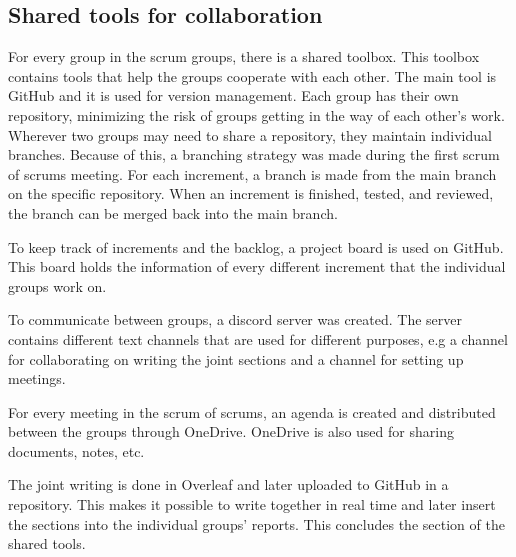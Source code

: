 \subsection{Shared tools for collaboration}\label{sub:shared-tools-for-collaboration}
For every group in the scrum groups, there is a shared toolbox.
This toolbox contains tools that help the groups cooperate with each other.
The main tool is GitHub and it is used for version management.  
Each group has their own repository, minimizing the risk of groups getting in the way of each other's work.
Wherever two groups may need to share a repository, they maintain individual branches.
Because of this, a branching strategy was made during the first scrum of scrums meeting.
For each increment, a branch is made from the main branch on the specific repository. 
When an increment is finished, tested, and reviewed, the branch can be merged back into the main branch.

To keep track of increments and the backlog, a project board is used on GitHub.
This board holds the information of every different increment that the individual groups work on.

To communicate between groups, a discord server was created.
The server contains different text channels that are used for different purposes, e.g a channel for collaborating on writing the joint sections and a channel for setting up meetings.

For every meeting in the scrum of scrums, an agenda is created and distributed between the groups through OneDrive.
OneDrive is also used for sharing documents, notes, etc.

The joint writing is done in Overleaf and later uploaded to GitHub in a repository.
This makes it possible to write together in real time and later insert the sections into the individual groups' reports.
This concludes the section of the shared tools.